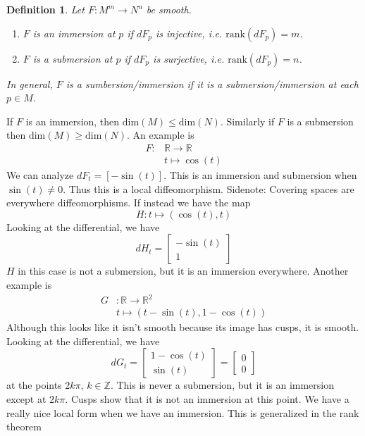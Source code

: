 \documentclass[a4paper]{article}
\newtheorem*{defn}{Definition}
\begin{document}
\begin{defn}
  Let $F:M^m \rightarrow N^n$ be smooth. 
  \begin{enumerate}
    \item $F$ is an immersion at $p$ if $dF_p$ is injective, i.e. $\text{rank}(dF_p) = m$.
    \item $F$ is a submersion at $p$ if $dF_p$ is surjective, i.e. $\text{rank}(dF_p) = n$.
  \end{enumerate}
  In general, $F$ is a sumbersion/immersion if it is a submersion/immersion at each $p\in M$.
\end{defn}
If $F$ is an immersion, then $\text{dim}(M) \leq \text{dim}(N)$. Similarly if $F$ is a submersion then $\text{dim}(M) \geq \text{dim}(N)$. An example is
\[
  \begin{aligned}
    F: &\mathds{R} \rightarrow \mathds{R} \\
       &t \mapsto \cos(t)
  \end{aligned}
\]
We can analyze $dF_t = [-\sin(t)]$. This is an immersion and submersion when $\sin(t) \neq 0$. Thus this is a local diffeomorphism. Sidenote: Covering spaces are everywhere diffeomorphisms. If instead we have the map
\[
  H: t \mapsto (\cos(t), t)
\]
Looking at the differential, we have
\[
  dH_t = 
  \begin{bmatrix}
  -\sin(t) \\
  1
  \end{bmatrix}
\]
$H$ in this case is not a submersion, but it is an immersion everywhere. Another example is
\[
  \begin{aligned}
    G&: \mathds{R} \rightarrow \mathds{R}^2 \\
     &t \mapsto (t - \sin(t), 1 - \cos(t))
  \end{aligned}
\]
Although this looks like it isn't smooth because its image has cusps, it is smooth. Looking at the differential, we have
\[
  dG_t = 
  \begin{bmatrix}
    1 - \cos(t) \\
    \sin(t)
  \end{bmatrix}
  = 
  \begin{bmatrix}
    0 \\
    0
  \end{bmatrix}
\]
at the points $2k\pi$, $k \in \mathds{Z}$. This is never a submersion, but it is an immersion except at $2k\pi$. Cusps show that it is not an immersion at this point. We have a really nice local form when we have an immersion. This is generalized in the rank theorem
\end{document}
